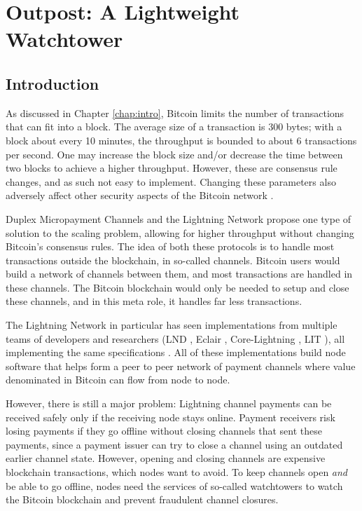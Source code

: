 \chapter{Outpost: A Lightweight Watchtower}  %
\label{chapter:outpost}

\section{Introduction}
As discussed in Chapter \ref{chap:intro},  Bitcoin limits the number of transactions that can fit into a block. The average size of a transaction is 300 bytes; with a block about every 10 minutes, the throughput is bounded to about 6 transactions per second. One may increase the block size and/or decrease the time between two blocks to achieve a higher throughput. However, these are consensus rule changes, and as such not easy to implement. Changing these parameters also adversely affect other security aspects of the Bitcoin network \cite{gervais2016security}.

Duplex Micropayment Channels \cite{decker_wattenhofer} and the Lightning Network \cite{poon_dryja} propose one type of solution to the scaling problem, allowing for higher throughput without changing Bitcoin's consensus rules. The idea of both these protocols is to handle most transactions outside the blockchain, in so-called channels. Bitcoin users would build a network of channels between them, and most transactions are handled in these channels. The Bitcoin blockchain would only be needed to setup and close these channels, and in this meta role, it handles far less transactions. 

The Lightning Network in particular has seen implementations from multiple teams of developers and researchers (LND \cite{lnd}, Eclair \cite{eclair}, Core-Lightning \cite{c_lightning}, LIT \cite{lit}), all implementing the same specifications \cite{bolt}. All of these implementations build node software that helps form a peer to peer network of payment channels where value denominated in Bitcoin can flow from node to node. 

However, there is still a major problem: Lightning channel payments can be received safely only if the receiving node stays online. Payment receivers risk losing payments if they go offline without closing channels that sent these payments, since a payment issuer can try to close a channel using an outdated earlier channel state. However, opening and closing channels are expensive blockchain transactions, which nodes want to avoid. To keep channels open \textit{and} be able to go offline, nodes need the services of so-called watchtowers \cite{watchtowers} to watch the Bitcoin blockchain and prevent fraudulent channel closures.


